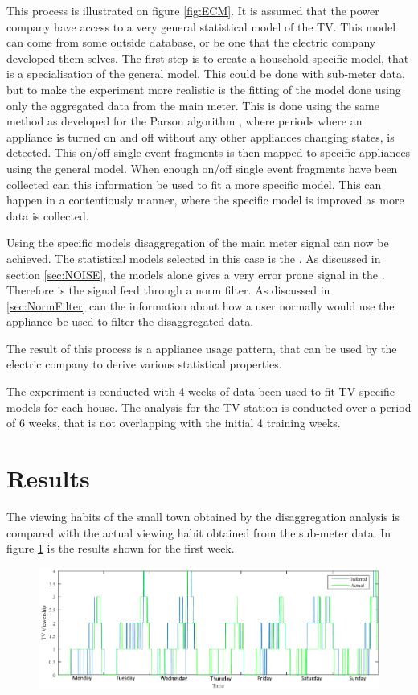 This process is illustrated on figure \ref{fig:ECM}. It is assumed that the power company have access to a very general statistical model of the TV. This model can come from some outside database, or be one that the electric company developed them selves. The first step is to create a household specific model, that is a specialisation of the general model. This could be done with sub-meter data, but to make the experiment more realistic is the fitting of the model done using only the aggregated data from the main meter. This is done using the same method as developed for the Parson algorithm \citep{RefWorks:28}, where periods where an appliance is turned on and off without any other appliances changing states, is detected. This on/off single event fragments is then mapped to specific appliances using the general model. When enough on/off single event fragments have been collected can this information be used to fit a more specific model. This can happen in a contentiously manner, where the specific model is improved as more data is collected.  

Using the specific models disaggregation of the main meter signal can now be achieved. The statistical models selected in this case is the . As discussed in section \ref{sec:NOISE}, the models alone gives a very error prone signal in the . Therefore is the signal feed through a norm filter. As discussed in \ref{sec:NormFilter} can the information about how a user normally would use the appliance be used to filter the disaggregated data. 

The result of this process is a appliance usage pattern, that can be used by the electric company to derive various statistical properties.  

The experiment is conducted with 4 weeks of data been used to fit TV specific models for each house. The analysis for the TV station is conducted over a period of 6 weeks, that is not overlapping with the initial 4 training weeks. 

\section{Results}
The viewing habits of the small town obtained by the disaggregation analysis is compared with the actual viewing habit obtained from the sub-meter data. In figure \ref{fig:WHW} is the results shown for the first week.   

\begin{figure}[H]
\centering
\includegraphics[width=1\textwidth]{billeder/Viewership.png}
\caption{}
\label{fig:WHW}
\end{figure}

